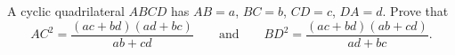 A cyclic quadrilateral $ABCD$ has $AB=a$, $BC=b$, $CD=c$, $DA=d$. Prove that
\[AC^2=\dfrac{(ac+bd)(ad+bc)}{ab+cd}\qquad\text{and}\qquad BD^2=\dfrac{(ac+bd)(ab+cd)}{ad+bc}.\]
